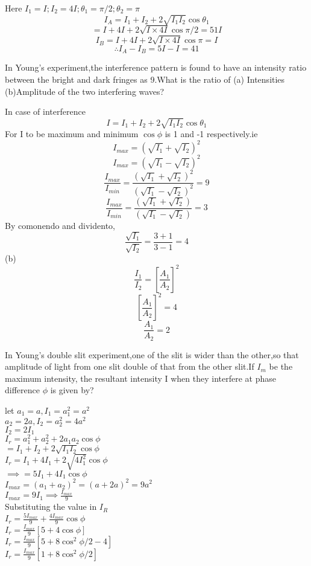 \begin{answer}
Here $I_1=I;I_2=4I;\theta_{1}=\pi/2;\theta_{2}=\pi$\\
$$I_A=I_1+I_2+2\sqrt{I_1I_2}\cos \theta_{1}$$
$$=I+4I+2\sqrt{I\times 4I}\cos\pi/2=51I$$
$$I_B=I+4I+2\sqrt{I\times 4I}\cos\pi=I$$
$$\therefore I_A-I_B=5I-I=41$$	
\end{answer}
\begin{exercise}
	In Young's experiment,the interference pattern is found to have an intensity ratio between the bright and dark fringes as 9.What is the ratio of (a) Intensities\\
	(b)Amplitude of the two interfering waves?
\end{exercise}
\begin{answer}
	In case of interference $$I=I_1+I_2+2\sqrt{I_1I_2}\cos \theta_{1}$$
	For I to be maximum and minimum $\cos\phi$ is 1 and -1 respectively.ie\\
	$$I_{max}=(\sqrt{I_1}+\sqrt{I_2})^2$$
	$$I_{max}=(\sqrt{I_1}-\sqrt{I_2})^2$$
	$$\frac{I_{max}}{I_{min}}=\frac{(\sqrt{I_1}+\sqrt{I_2})^2}{(\sqrt{I_1}-\sqrt{I_2})^2}=9$$
$$\frac{I_{max}}{I_{min}}=\frac{(\sqrt{I_1}+\sqrt{I_2})}{(\sqrt{I_1}-\sqrt{I_2})}=3$$
By comonendo and dividento,\\
$$\frac{\sqrt{I_1}}{\sqrt{I_2}}=\frac{3+1}{3-1}=4$$	
(b)$$\frac{I_1}{I_2}=\left[ \frac{A_1}{A_2}\right] ^2$$
$$\left[ \frac{A_1}{A_2}\right] ^2=4$$
$$\frac{A_1}{A_2}=2$$
\end{answer}
\begin{exercise}
	In Young's double slit experiment,one of the slit is wider than the other,so that amplitude of light from one slit double of that from the other slit.If $I_m$ be the maximum intensity, the resultant intensity I when they interfere at phase difference $\phi$ is given by? 
\end{exercise}
\begin{answer}
	let $a_1=a,I_1=a_1^2=a^2$\\
	$a_2=2a,I_2=a_2^2=4a^2$\\
	$I_2=2I_1$\\
	$I_r=a_1^2+a_2^2+2a_1a_2\cos\phi$\\
	$=I_1+I_2+2\sqrt{I_1I_2}\cos\phi$\\
	$I_r=I_1+4I_1+2\sqrt{4I_1^2}\cos\phi$\\
	$\implies =5I_1+4I_1\cos \phi$\\
	$I_{max}=(a_1+a_2)^2=(a+2a)^2=9a^2$\\
	$I_{max}=9I_1\implies\frac{I_{max}}{9}$\\
	Substituting the value in $I_R$\\
	$I_r=\frac{5I_{max}}{9}+\frac{4I_{max}}{9}\cos\phi$\\
	$I_r=\frac{I_{max}}{9}\left[ 5+4\cos\phi\right] $\\
	$I_r=\frac{I_{max}}{9}\left[ 5+8\cos^2\phi/2-4\right] $\\
	$I_r=\frac{I_{max}}{9}\left[ 1+8\cos^2\phi/2\right] $
\end{answer}
